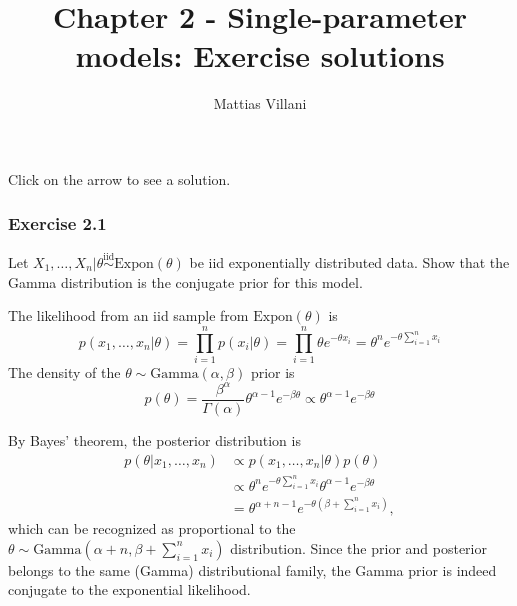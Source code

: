 \documentclass[
  letterpaper,
  DIV=11,
  numbers=noendperiod]{scrartcl}
\title{Chapter 2 - Single-parameter models: Exercise solutions}
\author{Mattias Villani}
\date{}
\begin{document}
\maketitle


Click on the arrow to see a solution.

\subsubsection{Exercise 2.1}\label{exercise-2.1}

Let
\(X_1,\ldots,X_n \vert \theta \overset{\mathrm{iid}}{\sim} \mathrm{Expon}(\theta)\)
be iid exponentially distributed data. Show that the Gamma distribution
is the conjugate prior for this model.

\begin{tcolorbox}[enhanced jigsaw, coltitle=black, breakable, colbacktitle=quarto-callout-note-color!10!white, colframe=quarto-callout-note-color-frame, bottomrule=.15mm, toprule=.15mm, rightrule=.15mm, arc=.35mm, colback=white, opacityback=0, bottomtitle=1mm, leftrule=.75mm, title={Solution}, titlerule=0mm, toptitle=1mm, left=2mm, opacitybacktitle=0.6]

The likelihood from an iid sample from \(\mathrm{Expon}(\theta)\) is \[
p(x_1,\ldots,x_n \vert \theta)= \prod_{i=1}^n p(x_i \vert \theta) = 
  \prod_{i=1}^n \theta e^{-\theta x_i} = \theta^n e^{-\theta\sum_{i=1}^n x_i}
\] The density of the \(\theta \sim \mathrm{Gamma}(\alpha,\beta)\) prior
is \[
p(\theta) =  \frac{\beta^\alpha}{\Gamma(\alpha)}\theta^{\alpha-1}e^{-\beta\theta} 
             \propto \theta^{\alpha-1}e^{-\beta\theta}
\]

By Bayes' theorem, the posterior distribution is \[
\begin{align}
  p(\theta \vert x_1,\ldots,x_n) &\propto p(x_1,\ldots,x_n \vert \theta)p(\theta)   \\
 & \propto \theta^n e^{-\theta\sum_{i=1}^n x_i}\theta^{\alpha-1}e^{-\beta\theta}  \\
 & =  \theta^{\alpha + n - 1} e^{ -\theta(\beta + \sum_{i=1}^n x_i)},
\end{align}
\] which can be recognized as proportional to the
\(\theta \sim \mathrm{Gamma}(\alpha +n,\beta + \sum\nolimits_{i=1}^n x_i)\)
distribution. Since the prior and posterior belongs to the same (Gamma)
distributional family, the Gamma prior is indeed conjugate to the
exponential likelihood.

\end{tcolorbox}
\end{document}
